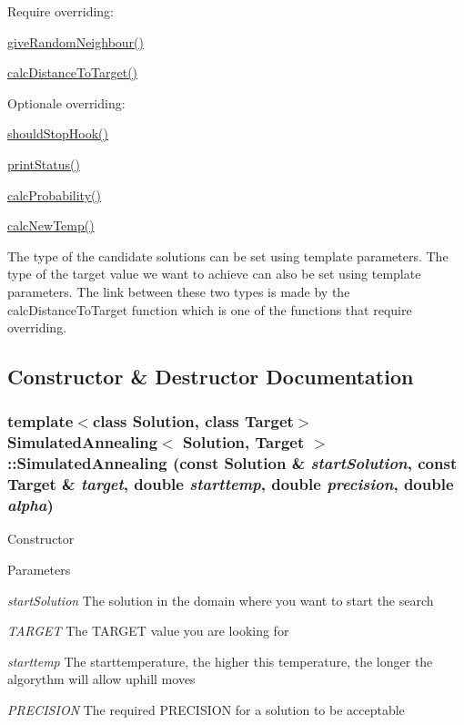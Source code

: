 Require overriding:
\begin{DoxyItemize}
\item \hyperlink{class_simulated_annealing_a71b64ea8dca2d5bba7fb6d4b6cde1c81}{giveRandomNeighbour()}
\item \hyperlink{class_simulated_annealing_ac68b8a3c38d3095893498b9a7e292346}{calcDistanceToTarget()}
\end{DoxyItemize}

Optionale overriding:
\begin{DoxyItemize}
\item \hyperlink{class_simulated_annealing_a52fd0bfedf6b9102adaba0ad494c8d54}{shouldStopHook()}
\item \hyperlink{class_simulated_annealing_accc3e21d0c77ac87ce604f17e014c11d}{printStatus()}
\item \hyperlink{class_simulated_annealing_ab452f2d789d884d549ea60515a3a9c2f}{calcProbability()}
\item \hyperlink{class_simulated_annealing_aa9cc1b49fb6f1f96b221c013e6ff7f00}{calcNewTemp()}
\end{DoxyItemize}

The type of the candidate solutions can be set using template parameters. The type of the target value we want to achieve can also be set using template parameters. The link between these two types is made by the calcDistanceToTarget function which is one of the functions that require overriding. 

\subsection{Constructor \& Destructor Documentation}
\hypertarget{class_simulated_annealing_a8bb5e4492141673dea7f6803a2b95466}{
\subsubsection[{SimulatedAnnealing}]{\setlength{\rightskip}{0pt plus 5cm}template$<$class Solution, class Target$>$ {\bf SimulatedAnnealing}$<$ Solution, Target $>$::{\bf SimulatedAnnealing} (const Solution \& {\em startSolution}, \/  const Target \& {\em target}, \/  double {\em starttemp}, \/  double {\em precision}, \/  double {\em alpha})}}
\label{class_simulated_annealing_a8bb5e4492141673dea7f6803a2b95466}
Constructor 
\begin{DoxyParams}{Parameters}
\item[{\em startSolution}]The solution in the domain where you want to start the search \item[{\em TARGET}]The TARGET value you are looking for \item[{\em starttemp}]The starttemperature, the higher this temperature, the longer the algorythm will allow uphill moves \item[{\em PRECISION}]The required PRECISION for a solution to be acceptable \end{DoxyParams}


